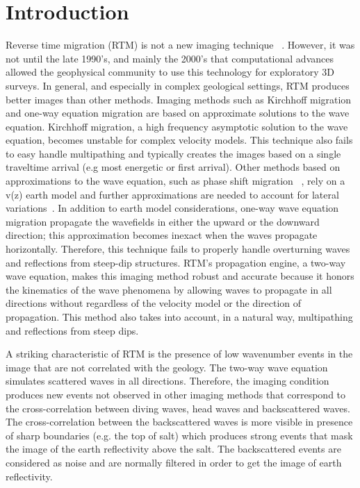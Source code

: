 \section{Introduction}

Reverse time migration (RTM) is not a new imaging technique ~\citep{baysal:1514, whitmore:382, GPR:GPR413}.
However, it was not until the late 1990’s, and mainly the 2000’s that computational
 advances allowed the geophysical community to use this technology for exploratory
3D surveys. In general, and especially in complex geological settings, RTM produces better 
images than other methods. Imaging methods such as Kirchhoff migration and one-way equation
 migration are based on approximate solutions to the wave equation. Kirchhoff migration,
 a high frequency asymptotic solution to the wave equation, becomes unstable for complex velocity models.
 This technique also fails to easy handle multipathing and typically creates the images based on a 
single traveltime arrival (e.g most energetic or first arrival). Other methods based on approximations to the wave
 equation, such as phase shift migration ~\citep{gazdag:1342}, rely on a v(z) earth model and further
 approximations are needed to account for lateral variations~\citep{gazdag:124}.
 In addition to earth model considerations, one-way wave equation migration propagate the wavefields in 
either the upward or the downward direction; this approximation becomes inexact when the waves 
propagate horizontally. Therefore, this technique fails to properly handle overturning
waves and reflections from steep-dip structures. RTM's propagation engine, a two-way wave equation, 
makes this imaging method robust and accurate because it honors the kinematics of 
the wave phenomena by allowing waves to propagate in all directions without regardless of
 the velocity model or the direction of propagation. This method also takes into account,
 in a natural way, multipathing and  reflections from steep dips.

A striking characteristic of RTM is the presence of low wavenumber events in the image that
 are not correlated with the geology. The two-way wave equation simulates scattered waves in all 
directions. Therefore, the imaging condition produces new events not observed in 
other imaging methods that correspond to the cross-correlation between diving waves, head waves 
and backscattered waves. The cross-correlation between the backscattered waves is more visible in
presence of sharp boundaries (e.g. the top of salt) which produces strong events that mask the image of the 
earth reflectivity above the salt. The backscattered events are considered as noise and are normally filtered in order
to get the image of earth reflectivity.

